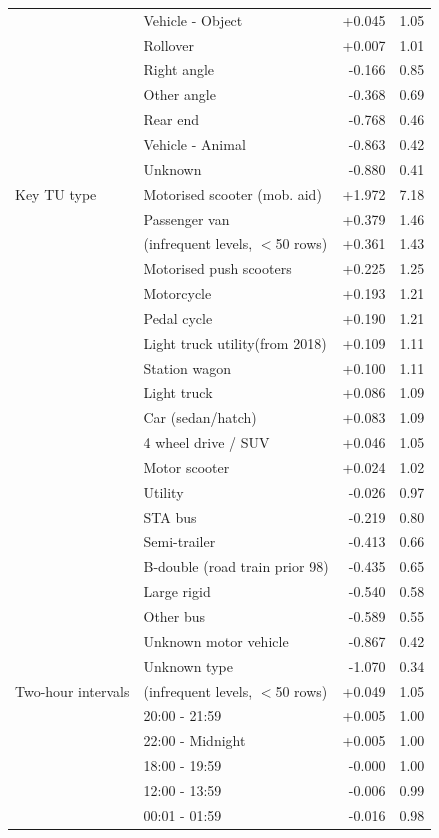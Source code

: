 \documentclass[11pt,a4paper]{article}
\begin{document}
{\begin{longtable}{@{}p{3.6cm}p{6.6cm}rr@{}}
 & Vehicle - Object & +0.045 & 1.05 \\
 & Rollover & +0.007 & 1.01 \\
 & Right angle & -0.166 & 0.85 \\
 & Other angle & -0.368 & 0.69 \\
 & Rear end & -0.768 & 0.46 \\
 & Vehicle - Animal & -0.863 & 0.42 \\
 & Unknown & -0.880 & 0.41 \\
\addlinespace[2pt]
Key TU type & Motorised scooter (mob. aid) & +1.972 & 7.18 \\
 & Passenger van & +0.379 & 1.46 \\
 & (infrequent levels, $<$50 rows) & +0.361 & 1.43 \\
 & Motorised push scooters & +0.225 & 1.25 \\
 & Motorcycle & +0.193 & 1.21 \\
 & Pedal cycle & +0.190 & 1.21 \\
 & Light truck utility(from 2018) & +0.109 & 1.11 \\
 & Station wagon & +0.100 & 1.11 \\
 & Light truck & +0.086 & 1.09 \\
 & Car (sedan/hatch) & +0.083 & 1.09 \\
 & 4 wheel drive / SUV & +0.046 & 1.05 \\
 & Motor scooter & +0.024 & 1.02 \\
 & Utility & -0.026 & 0.97 \\
 & STA bus & -0.219 & 0.80 \\
 & Semi-trailer & -0.413 & 0.66 \\
 & B-double (road train prior 98) & -0.435 & 0.65 \\
 & Large rigid & -0.540 & 0.58 \\
 & Other bus & -0.589 & 0.55 \\
 & Unknown motor vehicle & -0.867 & 0.42 \\
 & Unknown type & -1.070 & 0.34 \\
\addlinespace[2pt]
Two-hour intervals & (infrequent levels, $<$50 rows) & +0.049 & 1.05 \\
 & 20:00 - 21:59 & +0.005 & 1.00 \\
 & 22:00 - Midnight & +0.005 & 1.00 \\
 & 18:00 - 19:59 & -0.000 & 1.00 \\
 & 12:00 - 13:59 & -0.006 & 0.99 \\
 & 00:01 - 01:59 & -0.016 & 0.98 \\

\end{longtable}}
\end{document}
